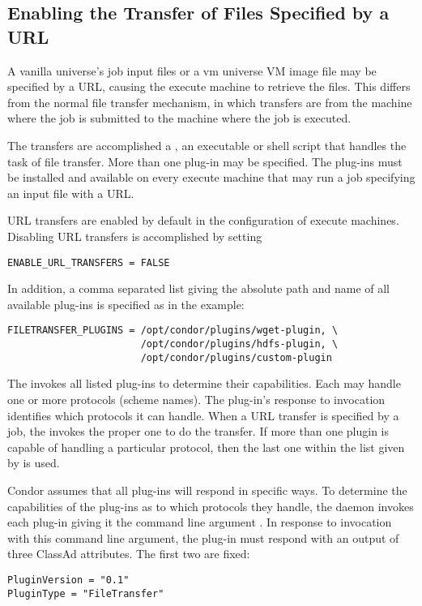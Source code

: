 \subsection{\label{sec:URL-transfer}
Enabling the Transfer of Files Specified by a URL}

A vanilla universe's job input files or a vm universe VM image file
may be specified by a URL,
causing the execute machine to retrieve the files.
This differs from the normal file transfer mechanism,
in which transfers are from the machine where the job is submitted
to the machine where the job is executed.

The transfers are accomplished a ,
an executable or shell script that handles the task of file transfer.
More than one plug-in may be specified.
The plug-ins must be installed and available on every execute machine 
that may run a job specifying an input file with a URL.

URL transfers are enabled by default in the configuration 
of execute machines.
Disabling URL transfers is accomplished by setting
\footnotesize
\begin{verbatim}
ENABLE_URL_TRANSFERS = FALSE
\end{verbatim}
\normalsize

In addition, a comma separated list giving the absolute path and name
of all available plug-ins is specified as in the example:
\footnotesize
\begin{verbatim}
FILETRANSFER_PLUGINS = /opt/condor/plugins/wget-plugin, \
                       /opt/condor/plugins/hdfs-plugin, \
                       /opt/condor/plugins/custom-plugin
\end{verbatim}
\normalsize

The  invokes all listed plug-ins to determine their 
capabilities. Each may handle one or more protocols (scheme names).
The plug-in's response to invocation identifies which protocols
it can handle.
When a URL transfer is specified by a job,
the  invokes the proper one to do the transfer.
If more than one plugin is capable of handling a particular protocol,
then the last one within the list given by 
is used.

Condor assumes that all plug-ins will respond in specific
ways.
To determine the capabilities of the plug-ins as to which protocols
they handle,
the \Condor{starter} daemon invokes each plug-in giving it the
command line argument .
In response to invocation with this command line argument,
the plug-in must respond with an output of three ClassAd attributes. 
The first two are fixed:
\footnotesize
\begin{verbatim}
PluginVersion = "0.1"
PluginType = "FileTransfer"
\end{verbatim}
\normalsize

